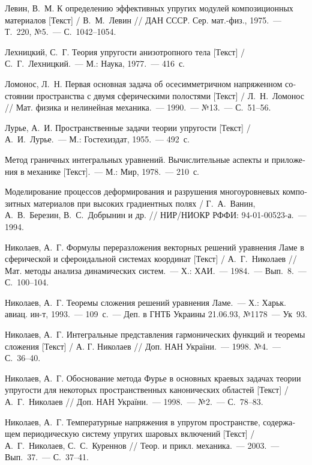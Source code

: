 \begin{russian}
\begin{biblist}{99}
Левин, В.~М. 
К определению эффективных упругих модулей композиционных материалов [Текст] 
/ В.~М.~Левин 
// ДАН СССР. Сер. мат.-физ., 1975.~--- Т.~220, №5.~--- С.~1042--1054.

Лехницкий, С.~Г. 
Теория упругости анизотропного тела [Текст] 
/ С.~Г.~Лехницкий.~--- М.: Наука, 1977.~--- 416~с.

Ломонос, Л.~Н. 
Первая основная задача об осесимметричном напряженном состоянии пространства с двумя сферическими полостями [Текст] 
/ Л.~Н.~Ломонос 
// Мат. физика и нелинейная механика.~--- 1990.~--- №13.~--- С.~51--56.

Лурье, А.~И. 
Пространственные задачи теории упругости [Текст] 
/ А.~И.~Лурье.~--- М.: Гостехиздат, 1955.~--- 492~с.

Метод граничных интегральных уравнений. Вычислительные аспекты и приложения в механике [Текст].~--- М.: Мир, 1978.~--- 210~с.

Моделирование процессов деформирования и разрушения многоуровневых композитных материалов при высоких градиентных полях 
/ Г.~А.~Ванин, А.~В.~Березин, В.~С.~Добрынин и др. 
// НИР/НИОКР РФФИ: 94-01-00523-а.~--- 1994.


Николаев, А.~Г. 
Формулы переразложения векторных решений уравнения Ламе в сферической и сфероидальной системах координат [Текст] 
/ А.~Г.~Николаев 
// Мат. методы анализа динамических систем.~--- Х.: ХАИ.~--- 1984.~--- Вып.~8.~--- С.~100--104.

Николаев, А.~Г. 
Теоремы сложения решений уравнения Ламе.~--- Х.: Харьк. авиац. ин-т, 1993.~--- 109~с.~--- Деп. в ГНТБ Украины 21.06.93, №1178~--- Ук~93.

Николаев, А.~Г. 
Интегральные представления гармонических функций и теоремы сложения [Текст] 
/ А. Г. Николаев // Доп. НАН України.~--- 1998. №4.~--- С.~36--40.

Николаев, А.~Г. 
Обоснование метода Фурье в основных краевых задачах теории упругости для некоторых пространственных канонических областей [Текст] 
/ А.~Г.~Николаев 
// Доп. НАН України.~--- 1998.~--- №2.~--- С.~78--83.

Николаев, А.~Г. 
Температурные напряжения в упругом пространстве, содержащем периодическую систему упругих шаровых включений [Текст] 
/ А.~Г.~Николаев, С.~С.~Куреннов 
// Теор. и прикл. механика.~--- 2003.~--- Вып.~37.~--- С.~37--41.


\end{biblist}
\end{russian}
